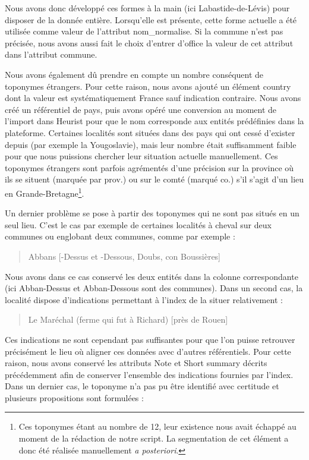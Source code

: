 \documentclass[a4paper,12pt,twoside]{book}
\begin{document}
	\noindent Nous avons donc développé ces formes à la main (ici \og Labastide-de-Lévis\fg{}) pour disposer de la donnée entière. Lorsqu'elle est présente, cette forme actuelle a été utilisée comme valeur de l'attribut \og nom\_normalise\fg{}. Si la commune n'est pas précisée, nous avons aussi fait le choix d'entrer d'office la valeur de cet attribut dans l'attribut \og commune\fg{}.
	
	Nous avons également dû prendre en compte un nombre conséquent de toponymes étrangers. Pour cette raison, nous avons ajouté un élément \og country\fg{} dont la valeur est systématiquement \og France\fg{} sauf indication contraire. Nous avons créé un référentiel de pays, puis avons opéré une conversion au moment de l'import dans Heurist pour que le nom corresponde aux entités prédéfinies dans la plateforme. Certaines localités sont situées dans des pays qui ont cessé d'exister depuis (par exemple la Yougoslavie), mais leur nombre était suffisamment faible pour que nous puissions chercher leur situation actuelle manuellement. Ces toponymes étrangers sont parfois agrémentés d'une précision sur la province où ils se situent (marquée par \og prov.\fg{}) ou sur le comté (marqué \og co.\fg{}) s'il s'agit d'un lieu en Grande-Bretagne\footnote{Ces toponymes étant au nombre de 12, leur existence nous avait échappé au moment de la rédaction de notre script. La segmentation de cet élément a donc été réalisée manuellement \textit{a posteriori}.}.
	
	Un dernier problème se pose à partir des toponymes qui ne sont pas situés en un seul lieu. C'est le cas par exemple de certaines localités à cheval sur deux communes ou englobant deux communes, comme par exemple :
	
	\begin{quotation}
		Abbans [-Dessus et -Dessous, Doubs, con Boussières]
	\end{quotation}
	
	\noindent Nous avons dans ce cas conservé les deux entités dans la colonne correspondante (ici \og Abban-Dessus\fg{} et \og Abban-Dessous\fg{} sont des communes). Dans un second cas, la localité dispose d'indications permettant à l'index de la situer relativement :
	
	\begin{quotation}
		Le Maréchal (ferme qui fut à Richard) [près de Rouen]
	\end{quotation}
	
	\noindent Ces indications ne sont cependant pas suffisantes pour que l'on puisse retrouver précisément le lieu où aligner ces données avec d'autres référentiels. Pour cette raison, nous avons conservé les attributs \og Note\fg{} et \og Short summary\fg{} décrits précédemment afin de conserver l'ensemble des indications fournies par l'index. Dans un dernier cas, le toponyme n'a pas pu être identifié avec certitude et plusieurs propositions sont formulées :
	
\end{document}

